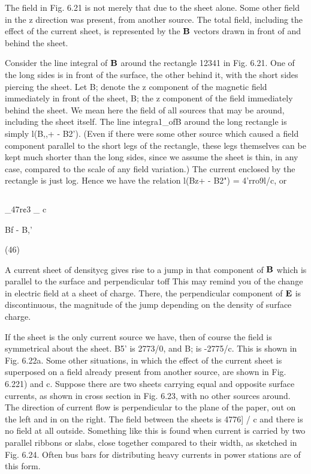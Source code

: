 The field in Fig. 6.21 is not merely that due to the sheet alone.
Some other field in the z direction was present, from another source.
The total field, including the effect of the current sheet, is represented
by the $\mathbf{B}$ vectors drawn in front of and behind the sheet.

Consider the line integral of $\mathbf{B}$ around the rectangle 12341 in
Fig. 6.21. One of the long sides is in front of the surface, the other
behind it, with the short sides piercing the sheet. Let B; denote the
z component of the magnetic field immediately in front of the sheet,
B; the z component of the field immediately behind the sheet. We
mean here the field of all sources that may be around, including the
sheet itself. The line integra1_ofB around the long rectangle is simply
l(B,,+ - B2'). (Even if there were some other source which caused
a field component parallel to the short legs of the rectangle, these
legs themselves can be kept much shorter than the long sides, since
we assume the sheet is thin, in any case, compared to the scale of any
field variation.) The current enclosed by the rectangle is just log.
Hence we have the relation l(Bz+ - B2") = 4'rro9l/c, or

\begin{equation}
\end{equation}

_47r¢3
_ c

Bf - B,'

(46)

 
 

A current sheet of densitycg gives rise to a jump in that component
of $\mathbf{B}$ which is parallel to the surface and perpendicular toff This
may remind you of the change in electric field at a sheet of charge.
There, the perpendicular component of $\mathbf{E}$ is discontinuous, the magnitude
of the jump depending on the density of surface charge.

If the sheet is the only current source we have, then of course the
field is symmetrical about the sheet. B5' is 2773/0, and B; is
-2775/c. This is shown in Fig. 6.22a. Some other situations, in
which the effect of the current sheet is superposed on a field already
present from another source, are shown in Fig. 6.221) and c. Suppose
there are two sheets carrying equal and opposite surface currents, as
shown in cross section in Fig. 6.23, with no other sources around.
The direction of current flow is perpendicular to the plane of the
paper, out on the left and in on the right. The field between the sheets
is 4776] / c and there is no field at all outside. Something like this is
found when current is carried by two parallel ribbons or slabs, close
together compared to their width, as sketched in Fig. 6.24. Often bus
bars for distributing heavy currents in power stations are of this form.


